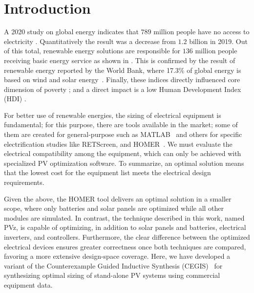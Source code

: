 \documentclass[review]{elsarticle}
\begin{document}

\maketitle

\section{Introduction}
A 2020 study on global energy indicates that $789$ million people have no access to electricity \citep{Energyprogressreport}. Quantitatively the result was a decrease from $1.2$ billion in 2019. Out of this total, renewable energy solutions are responsible for $136$ million people receiving basic energy service as shown in \cite{Energyprogressreport}. This is confirmed by the result of renewable energy reported by the World Bank, where 17.3\% of global energy is based on wind and solar energy~\citep{Energyprogressreport}. Finally, these indices directly influenced core dimension of poverty \citep{Hussein2012}; and a direct impact is a low Human Development Index (HDI) \citep{Coelho}. 

For better use of renewable energies, the sizing of electrical equipment is fundamental; for this purpose, there are tools available in the market; some of them are created for general-purpose such as MATLAB~\citep{Benatiallah2017} and others for specific electrification studies like RETScreen, and HOMER~\citep{Pradhan,Swarnkar}. We must evaluate the electrical compatibility among the equipment, which can only be achieved with specialized PV optimization software. To summarize, an optimal solution means that the lowest cost for the equipment list meets the electrical design requirements. 

Given the above, the HOMER tool delivers an optimal solution in a smaller scope, where only batteries and solar panels are optimized while all other modules are simulated. In contrast, the technique described in this work, named PVz, is capable of optimizing, in addition to solar panels and batteries, electrical inverters, and controllers. Furthermore, the clear difference between the optimized electrical devices ensures greater correctness once both techniques are compared, favoring a more extensive design-space coverage. Here, we have developed a variant of the Counterexample Guided Inductive Synthesis (CEGIS)~\citep{AbateCAV2018} for synthesizing optimal sizing of stand-alone PV systems using commercial equipment data. 
\end{document}
